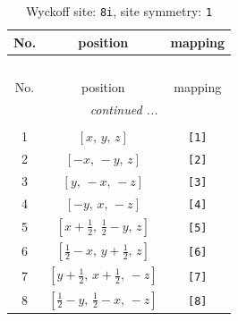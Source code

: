 \documentclass[fleqn,8pt]{jsarticle}
\begin{document}
\renewcommand{\arraystretch}{1.2}
\begin{longtable}{ccc}
\caption{Wyckoff site: {\tt 8i}, site symmetry: {\tt 1}}
 \\
 \hline \hline
No. & position & mapping \\ \hline \endfirsthead

\multicolumn{2}{l}{\tablename\ \thetable{}} \\
 \hline \hline
No. & position & mapping \\ \hline \endhead

 \hline \hline
\multicolumn{2}{r}{\footnotesize\it continued ...} \\ \endfoot

 \hline \hline
\multicolumn{2}{r}{} \\ \endlastfoot

1 & $\left[ x,\, y,\, z \right]$ & {\tt [1]} \\ \hline
2 & $\left[ - x,\, - y,\, z \right]$ & {\tt [2]} \\ \hline
3 & $\left[ y,\, - x,\, - z \right]$ & {\tt [3]} \\ \hline
4 & $\left[ - y,\, x,\, - z \right]$ & {\tt [4]} \\ \hline
5 & $\left[ x + \frac{1}{2},\, \frac{1}{2} - y,\, z \right]$ & {\tt [5]} \\ \hline
6 & $\left[ \frac{1}{2} - x,\, y + \frac{1}{2},\, z \right]$ & {\tt [6]} \\ \hline
7 & $\left[ y + \frac{1}{2},\, x + \frac{1}{2},\, - z \right]$ & {\tt [7]} \\ \hline
8 & $\left[ \frac{1}{2} - y,\, \frac{1}{2} - x,\, - z \right]$ & {\tt [8]} \\
\end{longtable}
\end{document}
